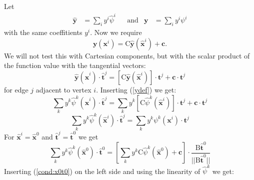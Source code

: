 \documentclass{scrartcl}
\begin{document}
Let
\begin{align}\label{ydef}
  \mathbf{\hat y}&=\sum_iy^i\hat\psi^i &&\text{and} &\mathbf y&=\sum_iy^i\psi^i
\end{align}
with the same coeffitients $y^i$.  Now we require
\begin{equation}
  \mathbf y(\mathbf x^i)=\mathrm C\mathbf{\hat y}(\mathbf{\hat x}^i)+\mathbf c.
\end{equation}
We will not test this with Cartesian components, but with the scalar product
of the function value with the tangential vectors:
\begin{equation}
  \mathbf{\hat y}(\mathbf{\hat x}^i)\cdot\mathbf{\hat t}^j
  =[\mathrm C\mathbf{\hat y}(\mathbf{\hat x}^i)]\cdot\mathbf t^j
  +\mathbf c\cdot\mathbf t^j  
\end{equation}
for edge $j$ adjacent to vertex $i$.  Inserting (\ref{ydef}) we get:
\begin{equation}
  \sum_ky^k\hat\psi^k(\mathbf{\hat x}^i)\cdot\mathbf{\hat t}^j
  =\sum_ky^k[\mathrm C\hat\psi^k(\mathbf{\hat x}^i)]\cdot\mathbf t^j
  +\mathbf c\cdot\mathbf t^j
\end{equation}
\begin{equation}
  \sum_ky^k\hat\psi^k(\mathbf{\hat x}^i)\cdot\mathbf{\hat t}^j
  =\sum_ky^k\psi^k(\mathbf x^i)\cdot\mathbf t^j
\end{equation}
For $\mathbf{\hat x}^i=\mathbf{\hat x}^0$ and $\mathbf{\hat t}^j=\mathbf{\hat
  t}^0$ we get
\begin{equation}
  \sum_ky^k\hat\psi^k(\mathbf{\hat x}^0)\cdot\mathbf{\hat t}^0
  =\left[\sum_ky^k\mathrm C\hat\psi^k(\mathbf{\hat x}^0)+\mathbf c\right]
    \cdot\frac{\mathrm B\mathbf{\hat t}^0}
              {||\mathrm B\mathbf{\hat t}^0||}
\end{equation}
Inserting (\ref{cond:x0t0}) on the left side and using the linearity of
$\hat\psi^k$ we get:
\end{document}
